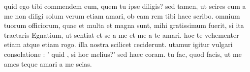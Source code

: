 


quid ego tibi commendem eum, quem tu ipse diligis? sed tamen, ut scires eum a me non diligi solum verum etiam amari, ob eam rem tibi haec scribo. omnium tuorum officiorum, quae et multa et magna sunt, mihi gratissimum fuerit, si ita tractaris Egnatium, ut sentiat et se a me et me a te amari. hoc te vehementer etiam atque etiam rogo. illa nostra scilicet ceciderunt. utamur igitur vulgari consolatione : ' quid , si hoc melius?' sed haec coram. tu fac, quod facis, ut me ames teque amari a me scias.
